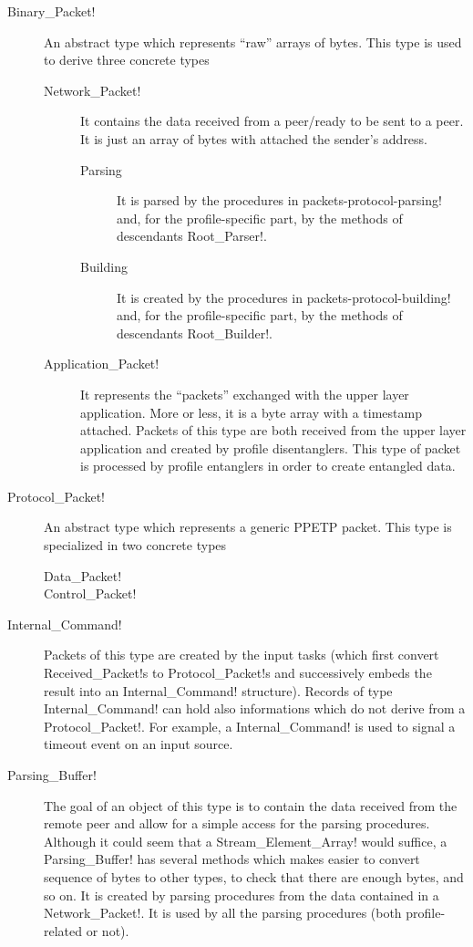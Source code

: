 \documentclass[a4paper]{medusabook}
\begin{document}
\begin{description}
\item[\ttt Binary\_Packet!] An abstract type which represents ``raw''
  arrays of bytes.  This type is used to derive three concrete types
  \begin{description}
     \item[\ttt Network\_Packet!] It contains the data received from a
       peer/ready to be sent to a peer.  It is just an array of bytes
       with attached the sender's address.
        \begin{description}
          \item[Parsing] It is parsed by the procedures in \ttt
            packets-protocol-parsing! and, for the profile-specific part,
            by the methods of descendants \ttt Root_Parser!.
          \item[Building] It is created by the procedures in
            \ttt packets-protocol-building! and, for the profile-specific part,
            by the methods of descendants \ttt Root_Builder!.
        \end{description}
     \item[\ttt Application\_Packet!] It represents the ``packets''
       exchanged with the upper layer application.  More or less, it is a
       byte array with a timestamp attached.  Packets of this type are
       both received from the upper layer application and created by
       profile disentanglers.  This type of packet is processed by
       profile entanglers in order to create entangled data.
  \end{description}
\item[\ttt Protocol\_Packet!] An abstract type which represents a
  generic PPETP packet.  This type is specialized in two concrete
  types
  \begin{description}
    \item[\ttt Data\_Packet!]  
    \item[\ttt Control\_Packet!]
  \end{description}
\item[\ttt Internal\_Command!] Packets of this type are created by the
  input tasks (which first convert \ttt Received_Packet!s to \ttt
  Protocol_Packet!s and successively embeds the result into an \ttt
  Internal\_Command! structure).  Records of type \ttt
  Internal\_Command! can hold also informations which do not derive
  from a \ttt Protocol_Packet!.  For example, a \ttt Internal_Command!
  is used to signal a timeout event on an input source.
\item[\ttt Parsing\_Buffer!]  The goal of an object of this type is to
  contain the data received from the remote peer and allow for a
  simple access for the parsing procedures.  Although it could seem
  that a \ttt Stream_Element_Array! would suffice, a \ttt
  Parsing\_Buffer! has several methods which makes easier to convert
  sequence of bytes to other types, to check that there are enough
  bytes, and so on.   It is created by parsing procedures  from the
  data contained in a \ttt Network_Packet!.  It is used by all the
  parsing procedures (both profile-related or not).
\end{description}
%



\end{document}
